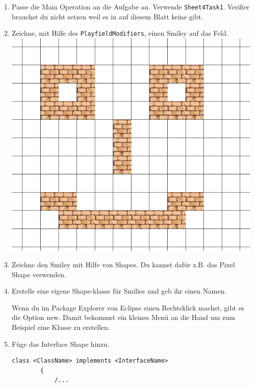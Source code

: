 \begin{enumerate}
    \item Passe die Main Operation an die Aufgabe an. Verwende \lstinline{Sheet4Task1}. Verifier brauchst du nicht setzen weil es in auf diesem Blatt keine gibt.
    \item Zeichne, mit Hilfe des \lstinline{PlayfieldModifiers}, einen Smiley auf das Feld.
    \\ \includegraphics[width=\linewidth]{./figures/smily.png}
    \item Zeichne den Smiley mit Hilfe von Shapes. Du kannst dafür z.B. das Pixel Shape verwenden.
    \item Erstelle eine eigene Shape-klasse für Smilies und geb ihr einen Namen.
    \begin{Infobox}
        Wenn du im Package Explorer von Eclipse einen Rechtsklick machst, gibt es die Option new.
        Damit bekommst ein kleines Menü an die Hand um zum Beispiel eine Klasse zu erstellen.
    \end{Infobox}
    \item Füge das Interface Shape hinzu.
    \begin{lstlisting}[title=Interface Syntax,frame=ltr]
        class <ClassName> implements <InterfaceName>
        {
            /...
    \end{lstlisting}
    \begin{Infobox}[Interface]

\end{Infobox}
\end{enumerate}
